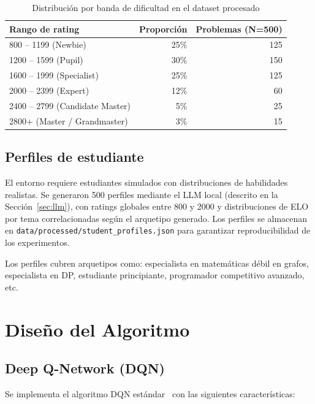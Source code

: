 \documentclass[12pt, a4paper]{article}
\begin{document}
\begin{table}[H]
\centering
\caption{Distribución por banda de dificultad en el dataset procesado}
\begin{tabular}{lrr}
\toprule
\textbf{Rango de rating} & \textbf{Proporción} & \textbf{Problemas (N=500)} \\
\midrule
800 -- 1199 (Newbie)          & 25\% & 125 \\
1200 -- 1599 (Pupil)          & 30\% & 150 \\
1600 -- 1999 (Specialist)     & 25\% & 125 \\
2000 -- 2399 (Expert)         & 12\% &  60 \\
2400 -- 2799 (Candidate Master) & 5\% & 25 \\
2800+ (Master / Grandmaster)   & 3\% & 15 \\
\bottomrule
\end{tabular}
\end{table}

\subsection{Perfiles de estudiante}

El entorno requiere estudiantes simulados con distribuciones de habilidades
realistas. Se generaron 500 perfiles mediante el LLM local (descrito en la
Sección~\ref{sec:llm}), con ratings globales entre 800 y 2000 y distribuciones
de ELO por tema correlacionadas según el arquetipo generado. Los perfiles se
almacenan en \texttt{data/processed/student\_profiles.json} para garantizar
reproducibilidad de los experimentos.

Los perfiles cubren arquetipos como: especialista en matemáticas débil en grafos,
especialista en DP, estudiante principiante, programador competitivo avanzado, etc.

\section{Diseño del Algoritmo}

\subsection{Deep Q-Network (DQN)}

Se implementa el algoritmo DQN estándar~\cite{mnih2015} con las siguientes
características:
\end{document}
